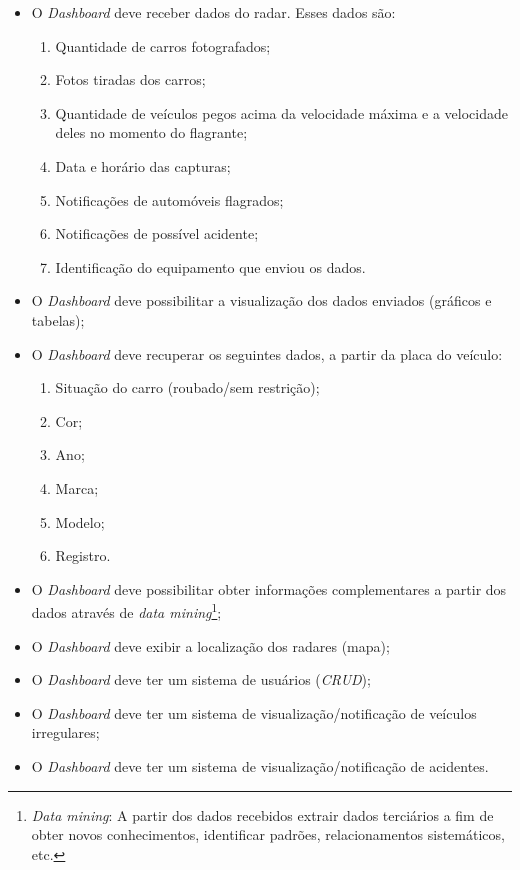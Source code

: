 \begin{itemize}
    \item O \textit{Dashboard} deve receber dados do radar. Esses dados são:
    \begin{enumerate}
        \item Quantidade de carros fotografados;
        \item Fotos tiradas dos carros;
        \item Quantidade de veículos pegos acima da velocidade máxima e a velocidade deles no momento do flagrante;
        \item Data e horário das capturas;
        \item Notificações de automóveis flagrados;
        \item Notificações de possível acidente;
        \item Identificação do equipamento que enviou os dados.
    \end{enumerate}

    \item O \textit{Dashboard} deve possibilitar a visualização dos dados enviados (gráficos e tabelas);

    \item O \textit{Dashboard} deve recuperar os seguintes dados, a partir da placa do veículo:
    \begin{enumerate}
        \item Situação do carro (roubado/sem restrição);
        \item Cor;
        \item Ano;
        \item Marca;
        \item Modelo;
        \item Registro.
    \end{enumerate}

    \item O \textit{Dashboard} deve possibilitar obter informações complementares a partir dos dados através de \textit{data mining}\footnote{\textit{Data mining}: A partir dos dados recebidos extrair dados terciários a fim de obter novos conhecimentos, identificar padrões, relacionamentos sistemáticos, etc.};
    \item O \textit{Dashboard} deve exibir a localização dos radares (mapa);
    \item O \textit{Dashboard} deve ter um sistema de usuários (\textit{CRUD});
    \item O \textit{Dashboard} deve ter um sistema de visualização/notificação de veículos irregulares;
    \item O \textit{Dashboard} deve ter um sistema de visualização/notificação de acidentes.
\end{itemize}

